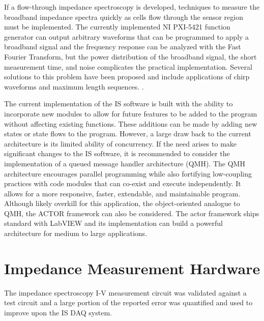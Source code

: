 \par If a flow-through impedance spectroscopy is developed, techniques to measure the broadband impedance spectra quickly as cells flow through the sensor region must be implemented. The currently implemented NI PXI-5421 function generator can output arbitrary waveforms that can be programmed to apply a broadband signal and the frequency response can be analyzed with the Fast Fourier Transform, but the power distribution of the broadband signal, the short measurement time, and noise complicates the practical implementation. Several solutions to this problem have been proposed and include applications of chirp waveforms and maximum length sequences. \cite{min_broadband_2010, sun_digital_2009,sun_broadband_2007}. 

\par The current implementation of the IS software is built with the ability to incorporate new modules to allow for future features to be added to the program without affecting existing functions. These additions can be made by adding new states or state flows to the program. However, a large draw back to the current architecture is its limited ability of concurrency. If the need arises to make significant changes to the IS software, it is recommended to consider the implementation of a queued message handler architecture (QMH). The QMH architecture encourages parallel programming while also fortifying low-coupling practices with code modules that can co-exist and execute independently. It allows for a more responsive, faster, extendable, and maintainable program. Although likely overkill for this application, the object-oriented analogue to QMH, the ACTOR framework can also be considered. The actor framework ships standard with LabVIEW and its implementation can build a powerful architecture for medium to large applications.

\section{Impedance Measurement Hardware}
\label{sec:discussion on Impedance Measurement Hardware}

\par The impedance spectroscopy I-V measurement circuit was validated against a test circuit and a large portion of the reported error was quantified and used to improve upon the IS DAQ system. 

